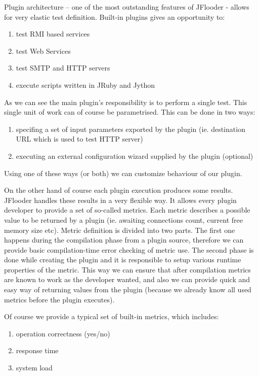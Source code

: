 \documentclass{article}
\begin{document}
Plugin architecture – one of the most outstanding features of JFlooder - allows for very elastic test definition. Built-in plugins gives an opportunity to:
\begin{enumerate}
\item{test RMI based services}
\item{test Web Services}
\item{test SMTP and HTTP servers}
\item{execute scripts written in JRuby and Jython}
\end{enumerate}

As we can see the main plugin's responsibility is to perform a single test.
This single unit of work can of course be parametrised.
This can be done in two ways:
\begin{enumerate}
\item{specifing a set of input parameters exported by the plugin (ie. destination URL which is used to test HTTP server)}
\item{executing an external configuration wizard supplied by the plugin (optional)}
\end{enumerate}
Using one of these ways (or both) we can customize behaviour of our plugin.

On the other hand of course each plugin execution produces some results.
JFlooder handles these results in a very flexible way.
It allows every plugin developer to provide a set of so-called metrics.
Each metric describes a possible value to be returned by a plugin (ie. awaiting connections count, current free memory size etc).
Metric definition is divided into two parts.
The first one happens during the compilation phase from a plugin source, therefore we can provide basic compilation-time error checking of metric use.
The second phase is done while creating the plugin and it is responsible to setup various runtime properties of the metric.
This way we can ensure that after compilation metrics are known to work as the developer wanted, and also we can provide quick and easy way of returning values from the plugin (because we already know all used metrics before the plugin executes).

Of course we provide a typical set of built-in metrics, which includes:
\begin{enumerate}
\item{operation correctness (yes/no)}
\item{response time}
\item{system load}
\end{enumerate}
\end{document}

